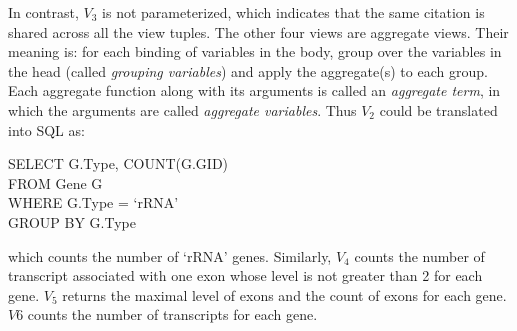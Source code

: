 In contrast, $V_3$ is not parameterized, which indicates that the same citation is shared across all the view tuples.
The other four views are aggregate views. Their meaning is: for each binding of variables in the body, group over the variables  in the head (called {\em grouping variables}) and apply the aggregate(s) to each group. Each {aggregate function} along with its arguments is called an {\em aggregate term}, in which the arguments are called {\em aggregate variables}.
Thus $V_2$ could be translated into SQL as:
\begin{tabbing}
SELECT G.Type, COUNT(G.GID)\\
FROM Gene G\\
WHERE G.Type = `rRNA'\\
GROUP BY G.Type
\end{tabbing}
which counts the number of `rRNA' genes. Similarly, $V_4$ counts the number of transcript associated with one exon whose level is not greater than 2 for each gene.
$V_5$ returns the maximal level of exons and the count of exons for each gene.
$V6$ counts the number of transcripts for each gene.

